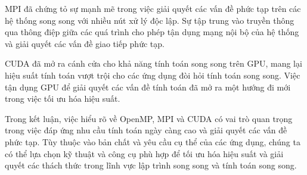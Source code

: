 \documentclass[14pt, a4paper]{article}
\numberwithin{equation}{section}
\numberwithin{figure}{section}
\numberwithin{dl}{section}
\numberwithin{md}{section}
\numberwithin{bd}{section}
\numberwithin{dn}{section}
\numberwithin{hq}{section}
\begin{document}
MPI đã chứng tỏ sự mạnh mẽ trong việc giải quyết các vấn đề phức tạp trên các hệ thống song song với nhiều nút xử lý độc lập. Sự tập trung vào truyền thông qua thông điệp giữa các quá trình cho phép tận dụng mạng nội bộ của hệ thống và giải quyết các vấn đề giao tiếp phức tạp.

CUDA đã mở ra cánh cửa cho khả năng tính toán song song trên GPU, mang lại hiệu suất tính toán vượt trội cho các ứng dụng đòi hỏi tính toán song song. Việc tận dụng GPU để giải quyết các vấn đề tính toán đã mở ra một hướng đi mới trong việc tối ưu hóa hiệu suất.

Trong kết luận, việc hiểu rõ về OpenMP, MPI và CUDA có vai trò quan trọng trong việc đáp ứng nhu cầu tính toán ngày càng cao và giải quyết các vấn đề phức tạp. Tùy thuộc vào bản chất và yêu cầu cụ thể của các ứng dụng, chúng ta có thể lựa chọn kỹ thuật và công cụ phù hợp để tối ưu hóa hiệu suất và giải quyết các thách thức trong lĩnh vực lập trình song song và tính toán song song.

\newpage
{}
%
%
\printbibliography[title={TÀI LIỆU THAM KHẢO}]
\end{document}
